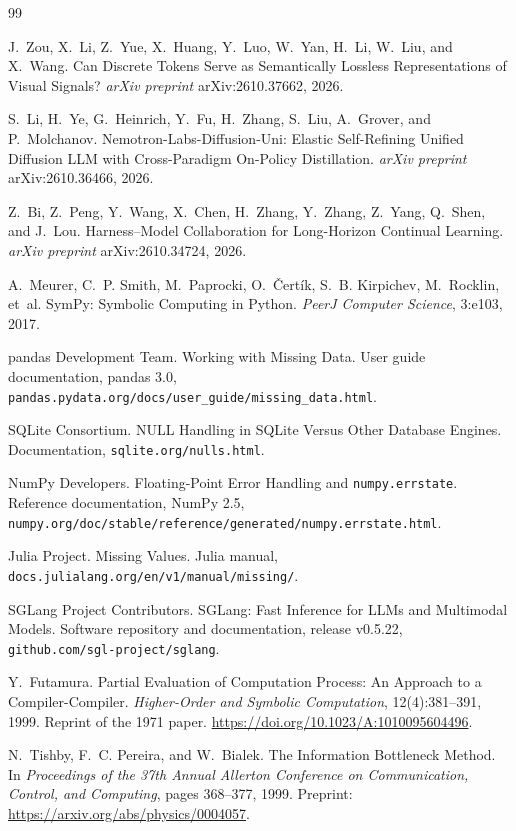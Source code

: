 \documentclass[11pt]{article}
\theoremstyle{remark}
\begin{document}
\begin{thebibliography}{99}
\sloppy

J.~Zou, X.~Li, Z.~Yue, X.~Huang, Y.~Luo, W.~Yan, H.~Li, W.~Liu, and X.~Wang.
Can Discrete Tokens Serve as Semantically Lossless Representations of Visual Signals?
\emph{arXiv preprint} arXiv:2610.37662, 2026.

S.~Li, H.~Ye, G.~Heinrich, Y.~Fu, H.~Zhang, S.~Liu, A.~Grover, and P.~Molchanov.
Nemotron-Labs-Diffusion-Uni: Elastic Self-Refining Unified Diffusion LLM with Cross-Paradigm On-Policy Distillation.
\emph{arXiv preprint} arXiv:2610.36466, 2026.

Z.~Bi, Z.~Peng, Y.~Wang, X.~Chen, H.~Zhang, Y.~Zhang, Z.~Yang, Q.~Shen, and J.~Lou.
Harness--Model Collaboration for Long-Horizon Continual Learning.
\emph{arXiv preprint} arXiv:2610.34724, 2026.

A.~Meurer, C.~P. Smith, M.~Paprocki, O.~\v{C}ert\'{i}k, S.~B. Kirpichev, M.~Rocklin, et~al.
SymPy: Symbolic Computing in Python.
\emph{PeerJ Computer Science}, 3:e103, 2017.

pandas Development Team.
Working with Missing Data.
User guide documentation, pandas 3.0, \texttt{pandas.pydata.org/docs/user\_guide/missing\_data.html}.

SQLite Consortium.
NULL Handling in SQLite Versus Other Database Engines.
Documentation, \texttt{sqlite.org/nulls.html}.

NumPy Developers.
Floating-Point Error Handling and \texttt{numpy.errstate}.
Reference documentation, NumPy 2.5, \texttt{numpy.org/doc/stable/reference/generated/numpy.errstate.html}.

Julia Project.
Missing Values.
Julia manual, \texttt{docs.julialang.org/en/v1/manual/missing/}.

SGLang Project Contributors.
SGLang: Fast Inference for LLMs and Multimodal Models.
Software repository and documentation, release v0.5.22, \texttt{github.com/sgl-project/sglang}.

Y.~Futamura.
Partial Evaluation of Computation Process: An Approach to a Compiler-Compiler.
\emph{Higher-Order and Symbolic Computation}, 12(4):381--391, 1999.
Reprint of the 1971 paper. \url{https://doi.org/10.1023/A:1010095604496}.

N.~Tishby, F.~C. Pereira, and W.~Bialek.
The Information Bottleneck Method.
In \emph{Proceedings of the 37th Annual Allerton Conference on Communication, Control, and Computing}, pages 368--377, 1999.
Preprint: \url{https://arxiv.org/abs/physics/0004057}.


\end{thebibliography}
\end{document}
